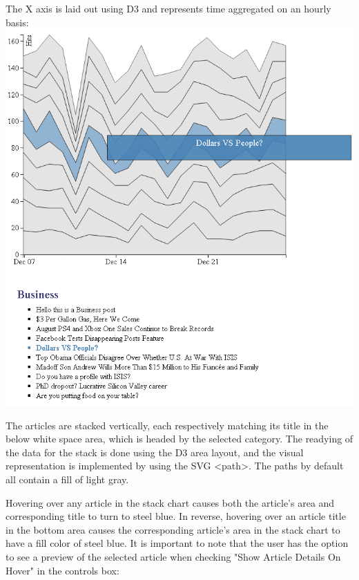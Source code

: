 \documentclass[12pt]{article}
\begin{document}
{\newpage

\noindent The X axis is laid out using D3 and represents time aggregated on an hourly basis: \\

\noindent\includegraphics[scale=0.8]{img/viz_1}

The articles are stacked vertically, each respectively matching its title in the below white space area, which is headed by the selected category. The readying of the data for the stack is done using the D3 area layout, and the visual representation is implemented by using the SVG <path>. The paths by default all contain a fill of light gray. 

Hovering over any article in the stack chart causes both the article's area and corresponding title to turn to steel blue. In reverse, hovering over an article title in the bottom area causes the corresponding article's area in the stack chart to have a fill color of steel blue. 
It is important to note that the user has the option to see a preview of the selected article when checking "Show Article Details On Hover" in the controls box:

}
\end{document}
